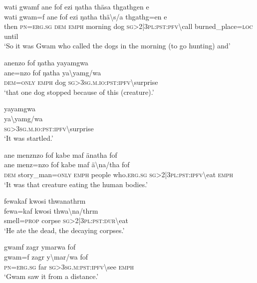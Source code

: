 \ea\label{ex:1:a3543}
wati gwamf ane fof ezi ŋatha thäsa thgathgen e\\
\gll wati	gwam=f	ane	fof	ezi	ŋatha	thä{\textbackslash}s/a	thgathg=en	e\\
     then	\textsc{pn}=\textsc{erg}.\textsc{sg}	\textsc{dem}	\textsc{emph}	morning	dog	\textsc{sg}>2|3\textsc{pl}:\textsc{pst}:\textsc{pfv}{\textbackslash}call	burned\_place=\textsc{loc}	until\\
\glt `So it was Gwam who called the dogs in the morning (to go hunting) and'
\z

\ea\label{ex:1:a3544}
anenzo fof ŋatha yayamgwa\\
\gll ane=nzo	fof	ŋatha	ya{\textbackslash}yamg/wa\\
     \textsc{dem}=\textsc{only}	\textsc{emph}	dog	\textsc{sg}>3\textsc{sg}.\textsc{m}.\textsc{io}:\textsc{pst}:\textsc{ipfv}{\textbackslash}surprise\\
\glt `that one dog stopped because of this (creature).'
\z

\ea\label{ex:1:a3545}
yayamgwa\\
\gll ya{\textbackslash}yamg/wa\\
     \textsc{sg}>3\textsc{sg}.\textsc{m}.\textsc{io}:\textsc{pst}:\textsc{ipfv}{\textbackslash}surprise\\
\glt `It was startled.'
\z

\ea\label{ex:1:a3547}
ane menznzo fof kabe maf änatha fof\\
\gll ane	menz=nzo	fof	kabe	maf	ä{\textbackslash}na/tha	fof\\
     \textsc{dem}	story\_man=\textsc{only}	\textsc{emph}	people	who.\textsc{erg}.\textsc{sg}	\textsc{sg}>2|3\textsc{pl}:\textsc{pst}:\textsc{ipfv}{\textbackslash}eat	\textsc{emph}\\
\glt `It was that creature eating the human bodies.'
\z

\ea\label{ex:1:a3548}
fewakaf kwosi thwanathrm\\
\gll fewa=kaf	kwosi	thwa{\textbackslash}na/thrm\\
     smell=\textsc{prop}	corpse	\textsc{sg}>2|3\textsc{pl}:\textsc{pst}:\textsc{dur}{\textbackslash}eat\\
\glt `He ate the dead, the decaying corpses.'
\z

\ea\label{ex:1:a3549}
gwamf zagr ymarwa fof\\
\gll gwam=f	zagr	y{\textbackslash}mar/wa	fof\\
     \textsc{pn}=\textsc{erg}.\textsc{sg}	far	\textsc{sg}>3\textsc{sg}.\textsc{m}:\textsc{pst}:\textsc{ipfv}{\textbackslash}see	\textsc{emph}\\
\glt `Gwam saw it from a distance.'
\z

